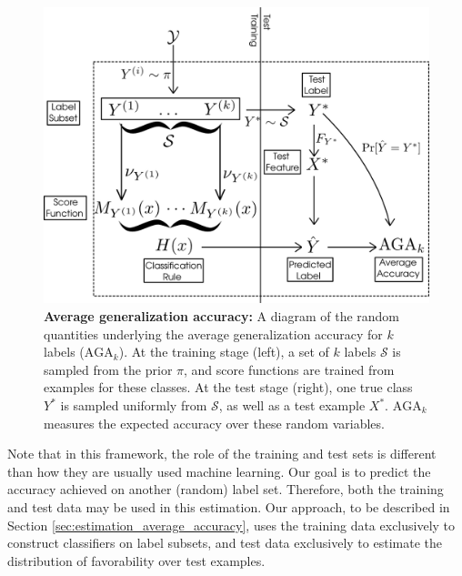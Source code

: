 \documentclass[twoside,11pt]{article}
\begin{document}
\begin{figure}[t]
\centering
\includegraphics[scale = 0.3]{average_risk.png}
\caption{\textbf{Average generalization accuracy:} A diagram of the random quantities underlying the average generalization accuracy for $k$ labels ($\text{AGA}_k$). At the training stage (left), a set of $k$ labels $\mathcal{S}$ is sampled from the prior $\pi$, and score functions are trained from examples for these classes. At the test stage (right), one true class $Y^*$ is sampled uniformly from $\mathcal{S}$, as well as a test example $X^*$. $\text{AGA}_k$ measures the expected accuracy over these random variables.}\label{fig:average_risk}
\end{figure}

Note that in this framework, the role of the training and test sets is different than how they are usually used machine learning.
Our goal is to predict the accuracy achieved on another (random) label set.
Therefore, both the training and test data may be used in this estimation.
Our approach, to be described in Section \ref{sec:estimation_average_accuracy}, uses the training data exclusively to construct classifiers on label subsets, and test data exclusively to estimate the distribution of favorability over test examples.

\end{document}
